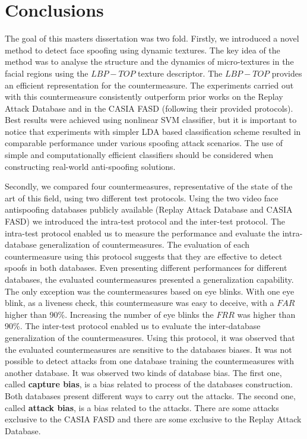 \chapter{Conclusions}
\label{chap:Conclusions}

The goal of this masters dissertation was two fold. Firstly, we introduced a novel method to detect face spoofing using dynamic textures. The key idea of the method was to analyse the structure and the dynamics of micro-textures in the facial regions using the $LBP-TOP$ texture descriptor. The $LBP-TOP$ provides an efficient representation for the countermeasure. The experiments carried out with this countermeasure consistently outperform prior works on the Replay Attack Database and in the CASIA FASD (following their provided protocols). Best results were achieved using nonlinear SVM classifier, but it is important to notice that experiments with simpler LDA based classification scheme resulted in comparable performance under various spoofing attack scenarios. The use of simple and computationally efficient classifiers should be considered when constructing real-world anti-spoofing solutions.

Secondly, we compared four countermeasures, representative of the state of the art of this field, using two different test protocols. Using the two video face antispoofing databases publicly available (Replay Attack Database and CASIA FASD) we introduced the intra-test protocol and the inter-test protocol. The intra-test protocol enabled us to measure the performance and evaluate the intra-database generalization of countermeasures. The evaluation of each countermeasure using this protocol suggests that they are effective to detect spoofs in both databases. Even presenting different performances for different databases, the evaluated countermeasures presented a generalization capability. The only exception was the countermeasures based on eye blinks. With one eye blink, as a liveness check, this countermeasure was easy to deceive, with a $FAR$ higher than 90\%. Increasing the number of eye blinks the $FRR$ was higher than 90\%. The inter-test protocol enabled us to evaluate the inter-database generalization of the countermeasures. Using this protocol, it was observed that the evaluated countermeasures are sensitive to the databases biases. It was not possible to detect attacks from one database training the countermeasures with another database. It was observed two kinds of database bias. The first one, called \textbf{capture bias}, is a bias related to process of the databases construction. Both databases present different ways to carry out the attacks. The second one, called \textbf{attack bias}, is a bias related to the attacks. There are some attacks exclusive to the CASIA FASD and there are some exclusive to the Replay Attack Database.

